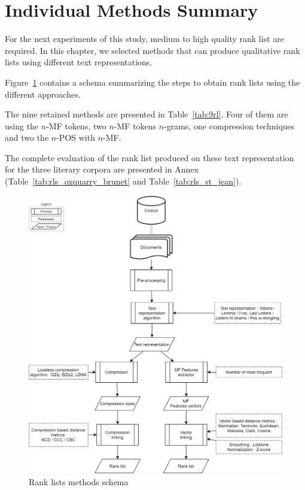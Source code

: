 \section{Individual Methods Summary \label{sec:individual_methods_summary}}

For the next experiments of this study, medium to high quality rank list are required.
In this chapter, we selected methods that can produce qualitative rank lists using different text representations.

Figure~\ref{fig:schema-rank_lists} contains a schema summarizing the steps to obtain rank lists using the different approaches.

The nine retained methods are presented in Table~\ref{tab:9rl}.
Four of them are using the $n$-MF tokens, two $n$-MF tokens $n$-grams, one compression techniques and two the $n$-POS with $n$-MF.

The complete evaluation of the rank list produced on these text representation for the three literary corpora are presented in Annex (Table~\ref{tab:rls_oxquarry_brunet} and Table~\ref{tab:rls_st_jean}).

\begin{figure}
  \centering
  \caption{Rank lists methods schema}
  \label{fig:schema-rank_lists}
  \includegraphics[width=0.90\linewidth]{img/schema-rank_lists.png}
\end{figure}

